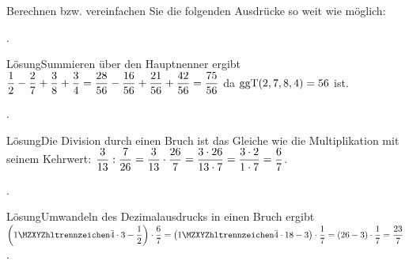 \begin{MExercises}
\begin{MExercise}
Berechnen bzw. vereinfachen Sie die folgenden Ausdrücke so weit wie möglich:
\begin{MExerciseItems}
\item{. \begin{MHint}{Lösung}Summieren über den Hauptnenner ergibt $\dfrac{1}{2}-\dfrac{2}{7}+\dfrac{3}{8}+\dfrac{3}{4}=\dfrac{28}{56}-\dfrac{16}{56}+\dfrac{21}{56}+\dfrac{42}{56}=\dfrac{75}{56}$ da $\mathrm{ggT}(2,7,8,4)=56$ ist.\end{MHint}}
\item{. \begin{MHint}{Lösung}Die Division durch einen Bruch ist das Gleiche wie die Multiplikation
mit seinem Kehrwert: $\dfrac{3}{13}:\dfrac{7}{26}=\dfrac{3}{13}\cdot\dfrac{26}{7}=\dfrac{3\cdot 26}{13\cdot 7}=\dfrac{3\cdot 2}{1\cdot 7}=\dfrac{6}{7}$.\end{MHint}}
\item{. \begin{MHint}{Lösung}Umwandeln des Dezimalausdrucks in einen Bruch ergibt
$\left(\MZahl{1}{}\bar{4}\cdot 3-\Mdfrac12\right)\cdot\Mdfrac{6}{7}=\left(\MZahl{1}{}\bar{4}\cdot 18-3\right)\cdot\Mdfrac{1}{7}=\left(26-3\right)\cdot\Mdfrac{1}{7}=\Mdfrac{23}{7}$.\end{MHint}}
\end{MExerciseItems}
\end{MExercise}


\end{MExercises}
